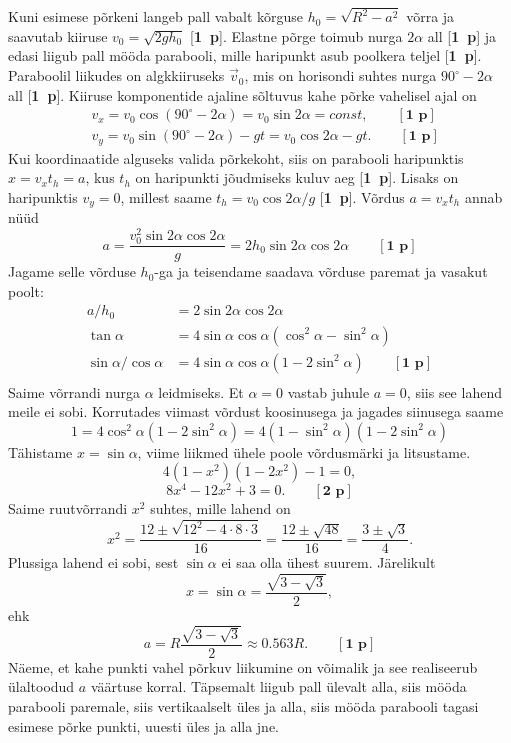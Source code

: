 \documentclass[11pt,a5paper]{article}
\newcommand{\p}[1]{[\textbf{#1~p}]}
\begin{document}
Kuni esimese põrkeni langeb pall vabalt kõrguse $h_0=\sqrt{R^2-a^2}$ võrra ja saavutab kiiruse $v_0=\sqrt{2gh_0}$ \p{1}. Elastne põrge toimub nurga $2\alpha$ all \p{1} ja edasi liigub pall mööda parabooli, mille haripunkt asub poolkera teljel \p{1}. Paraboolil liikudes on algkkiiruseks $\vec v_0$, mis on horisondi suhtes nurga $90^\circ-2\alpha$ all \p{1}. Kiiruse komponentide ajaline sõltuvus kahe põrke vahelisel ajal on
\begin{align*}
    &v_x=v_0\cos(90^\circ-2\alpha)=v_0\sin 2\alpha=const, \qquad\p{1}\\
    &v_y=v_0\sin(90^\circ-2\alpha)-gt=v_0\cos 2\alpha-gt. \qquad\p{1}
\end{align*}
Kui koordinaatide alguseks valida põrkekoht, siis on parabooli haripunktis $x=v_xt_h=a$, kus $t_h$ on haripunkti jõudmiseks kuluv aeg \p{1}. Lisaks on haripunktis $v_y=0$, millest saame
$t_h=v_0\cos 2\alpha/g$ \p{1}. Võrdus $a=v_xt_h$ annab nüüd
\[a=\frac{v_0^2\sin2\alpha\cos 2\alpha}{g}=2h_0\sin2\alpha\cos 2\alpha\qquad \p{1}\]
Jagame selle võrduse $h_0$-ga ja teisendame saadava võrduse paremat ja vasakut poolt:
\begin{align*}
a/h_0&=2\sin2\alpha\cos 2\alpha\\
\tan\alpha&=4\sin\alpha\cos\alpha(\cos^2\alpha-\sin^2\alpha)\\
\sin\alpha/\cos\alpha&=4\sin\alpha\cos\alpha(1-2\sin^2\alpha)\qquad \p{1}\\
\end{align*}
Saime võrrandi nurga $\alpha$ leidmiseks. Et $\alpha=0$ vastab juhule $a=0$, siis see lahend meile ei sobi. Korrutades viimast võrdust koosinusega ja jagades siinusega saame
\[1=4\cos^2\alpha(1-2\sin^2\alpha)=4(1-\sin^2\alpha)(1-2\sin^2\alpha)\]
Tähistame $x=\sin\alpha$, viime liikmed ühele poole võrdusmärki ja litsustame.
\[4(1-x^2)(1-2x^2)-1=0,\]
\[8x^4-12x^2+3=0.\qquad \p{2}\]
Saime ruutvõrrandi $x^2$ suhtes, mille lahend on
\[x^2=\frac{12\pm\sqrt{12^2-4\cdot8\cdot3}}{16}=\frac{12\pm\sqrt{48}}{16}=\frac{3\pm\sqrt{3}}{4}.\]
Plussiga lahend ei sobi, sest $\sin\alpha$ ei saa olla ühest suurem. Järelikult
\[x=\sin\alpha=\frac{\sqrt{3-\sqrt{3}}}{2},\]
ehk
\[a=R\frac{\sqrt{3-\sqrt{3}}}{2}\approx\num{0.563}R.\qquad \p{1}\]
Näeme, et kahe punkti vahel põrkuv liikumine on võimalik ja see realiseerub ülaltoodud $a$ väärtuse korral. Täpsemalt liigub pall ülevalt alla, siis mööda parabooli paremale, siis vertikaalselt üles ja alla, siis mööda parabooli tagasi esimese põrke punkti, uuesti üles ja alla jne.
\end{document}
